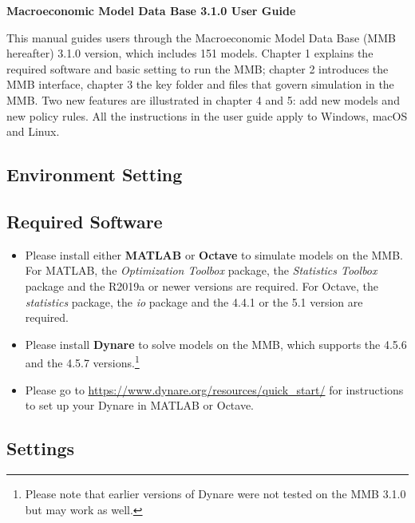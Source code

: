 \documentclass[10pt,a4paper]{article}
\begin{document}
\begin{center}
\textbf{{\LARGE Macroeconomic Model Data Base 3.1.0 User Guide}}
\end{center}
\bigskip
This manual guides users through the Macroeconomic Model Data Base (MMB hereafter) 3.1.0 version, which includes 151 models. Chapter 1 explains the required software and basic setting to run the MMB; chapter 2 introduces the MMB interface, chapter 3 the key folder and files that govern simulation in the MMB. Two new features are illustrated in chapter 4 and 5: add new models and new policy rules. All the instructions in the user guide apply to Windows, macOS and Linux.
\medskip

\begin{flushleft}
\section{Environment Setting}
\end{flushleft}
\medskip

\subsection{Required Software}
\medskip

\begin{itemize}
\item Please install either \textbf{MATLAB} or \textbf{Octave} to simulate models on the MMB. For MATLAB, the \textit{Optimization Toolbox} package, the \textit{Statistics Toolbox} package and the R2019a or newer versions are required. For Octave, the \textit{statistics} package, the \textit{io} package and the 4.4.1 or the 5.1 version are required.

\item Please install \textbf{Dynare} to solve models on the MMB, which supports the 4.5.6 and the 4.5.7 versions.\footnote{Please note that earlier versions of Dynare were not tested on the MMB 3.1.0 but may work as well.}

\item Please go to \url{https://www.dynare.org/resources/quick_start/} for instructions to set up your Dynare in MATLAB or Octave.
\end{itemize}

\subsection{Settings}
\medskip
\end{document}

